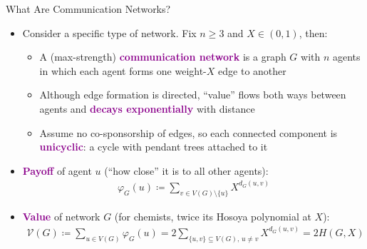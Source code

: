 \documentclass[xcolor=svgnames]{beamer}
\renewcommand{\emph}[1]{\textcolor{DarkMagenta}{\textbf{#1}}}
\def\V{\mathcal{V}}
\begin{document}
\begin{frame}{What Are Communication Networks?}
    \begin{itemize}
        \item Consider a specific type of network. Fix $n \ge 3$ and $X \in (0, 1)$, then:\vspace*{0.15cm}
        \begin{itemize}
            \item A (max-strength) \emph{communication network} is a graph $G$ with $n$ agents in which each agent forms one weight-$X$ edge to another\vspace*{0.15cm}
            \item Although edge formation is directed, ``value'' flows both ways between agents and \emph{decays exponentially} with distance\vspace*{0.15cm}
            \item Assume no co-sponsorship of edges, so each connected component is \emph{unicyclic}: a cycle with pendant trees attached to it\vspace*{0.15cm}
        \end{itemize}
        \item \emph{Payoff} of agent $u$ (``how close'' it is to all other agents):
        \begin{align*}
            \varphi_G(u) \coloneqq \sum_{v \in V(G) \setminus \{u\}} X^{d_G(u,v)}
        \end{align*}\vfill
        \item \emph{Value} of network $G$ (for chemists, twice its Hosoya polynomial at $X$):
        \begin{align*}
            \V(G) \coloneqq \sum_{u \in V(G)} \varphi_G(u) = 2 \sum_{\{u, v\} \subseteq V(G),\, u \ne v} X^{d_G(u,v)} = 2 H(G, X)
        \end{align*}
    \end{itemize}
\end{frame}
\end{document}

